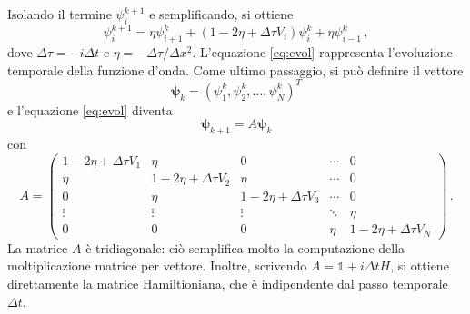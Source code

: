 \documentclass[a4paper, titlepage]{article}
\begin{document}
Isolando il termine $\psi_i^{k+1}$ e semplificando, si ottiene
\begin{equation}
    \psi_i^{k+1} = \eta \psi_{i+1}^k + (1 - 2\eta + \Delta\tau V_i)\psi_i^k + \eta\psi_{i-1}^k\, ,
    \label{eq:evol}
\end{equation}
dove $\Delta\tau = -i\Delta t$ e $\eta = - \Delta\tau/\Delta x^2$. L'equazione \eqref{eq:evol} rappresenta l'evoluzione temporale della funzione d'onda. Come ultimo passaggio, si può definire il vettore
\begin{equation*}
    \bm{\psi}_k = (\psi_1^k,\psi_2^k,\dots,\psi_N^k)^T
\end{equation*}
e l'equazione \eqref{eq:evol} diventa
\begin{equation*}
    \bm{\psi}_{k+1} = A\bm{\psi}_k
\end{equation*}
con
\begin{equation*} 
    A = \begin{pmatrix}
    1-2\eta + \Delta\tau V_1 & \eta & 0 & \cdots & 0 \\
    \eta & 1-2\eta + \Delta\tau V_2 & \eta & \cdots & 0 \\
     0 & \eta & 1-2\eta + \Delta\tau V_3 & \cdots & 0 \\
    \vdots & \vdots & \vdots & \ddots & \eta \\
    0 & 0 & 0 & \eta & 1-2\eta + \Delta\tau V_N 
    \end{pmatrix}\, . 
\end{equation*}
La matrice $A$ è tridiagonale: ciò semplifica molto la computazione della moltiplicazione matrice per vettore. Inoltre, scrivendo $A = \mathbb{1} + i\Delta t H$, si ottiene direttamente la matrice Hamiltioniana, che è indipendente dal passo temporale $\Delta t$.
\end{document}

